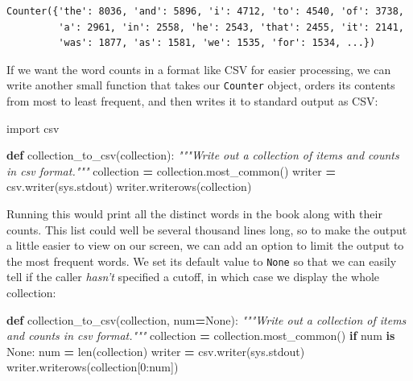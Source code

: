 \documentclass[
]{krantz}
\makeatletter
\newenvironment{Shaded}{\begin{snugshade}}{\end{snugshade}}
\newcommand{\BuiltInTok}[1]{#1}
\newcommand{\CommentTok}[1]{\textcolor[rgb]{0.56,0.35,0.01}{\textit{#1}}}
\newcommand{\ControlFlowTok}[1]{\textcolor[rgb]{0.13,0.29,0.53}{\textbf{#1}}}
\newcommand{\DecValTok}[1]{\textcolor[rgb]{0.00,0.00,0.81}{#1}}
\newcommand{\ImportTok}[1]{#1}
\newcommand{\KeywordTok}[1]{\textcolor[rgb]{0.13,0.29,0.53}{\textbf{#1}}}
\newcommand{\NormalTok}[1]{#1}
\newcommand{\OperatorTok}[1]{\textcolor[rgb]{0.81,0.36,0.00}{\textbf{#1}}}
\newcommand{\VariableTok}[1]{\textcolor[rgb]{0.00,0.00,0.00}{#1}}
\newenvironment{kframe}{%
\medskip{}
\setlength{\fboxsep}{.8em}
 \def\at@end@of@kframe{}%
 \ifinner\ifhmode%
  \def\at@end@of@kframe{\end{minipage}}%
  \begin{minipage}{\columnwidth}%
 \fi\fi%
 \def\FrameCommand##1{\hskip\@totalleftmargin \hskip-\fboxsep
 \colorbox{shadecolor}{##1}\hskip-\fboxsep
     \hskip-\linewidth \hskip-\@totalleftmargin \hskip\columnwidth}%
 \MakeFramed {\advance\hsize-\width
   \@totalleftmargin\z@ \linewidth\hsize
   \@setminipage}}%
 {\par\unskip\endMakeFramed%
 \at@end@of@kframe}
\renewenvironment{Shaded}{\begin{kframe}}{\end{kframe}}
\makeatother
\begin{document}
\begin{verbatim}
Counter({'the': 8036, 'and': 5896, 'i': 4712, 'to': 4540, 'of': 3738,
         'a': 2961, 'in': 2558, 'he': 2543, 'that': 2455, 'it': 2141,
         'was': 1877, 'as': 1581, 'we': 1535, 'for': 1534, ...})
\end{verbatim}

If we want the word counts in a format like CSV for easier processing,
we can write another small function that takes our \texttt{Counter} object,
orders its contents from most to least frequent,
and then writes it to standard output as CSV:

\begin{Shaded}
\begin{Highlighting}[]
\ImportTok{import}\NormalTok{ csv}


\KeywordTok{def}\NormalTok{ collection\_to\_csv(collection):}
    \CommentTok{"""Write out a collection of items and counts in csv format."""}
\NormalTok{    collection }\OperatorTok{=}\NormalTok{ collection.most\_common()}
\NormalTok{    writer }\OperatorTok{=}\NormalTok{ csv.writer(sys.stdout)}
\NormalTok{    writer.writerows(collection)}
\end{Highlighting}
\end{Shaded}

Running this would print all the distinct words in the book
along with their counts.
This list could well be several thousand lines long,
so to make the output a little easier to view on our screen,
we can add an option to limit the output to the most frequent words.
We set its default value to \texttt{None}
so that we can easily tell if the caller \emph{hasn't} specified a cutoff,
in which case we display the whole collection:

\begin{Shaded}
\begin{Highlighting}[]
\KeywordTok{def}\NormalTok{ collection\_to\_csv(collection, num}\OperatorTok{=}\VariableTok{None}\NormalTok{):}
    \CommentTok{"""Write out a collection of items and counts in csv format."""}
\NormalTok{    collection }\OperatorTok{=}\NormalTok{ collection.most\_common()}
    \ControlFlowTok{if}\NormalTok{ num }\KeywordTok{is} \VariableTok{None}\NormalTok{:}
\NormalTok{        num }\OperatorTok{=} \BuiltInTok{len}\NormalTok{(collection)}
\NormalTok{    writer }\OperatorTok{=}\NormalTok{ csv.writer(sys.stdout)}
\NormalTok{    writer.writerows(collection[}\DecValTok{0}\NormalTok{:num])}
\end{Highlighting}
\end{Shaded}
\end{document}
